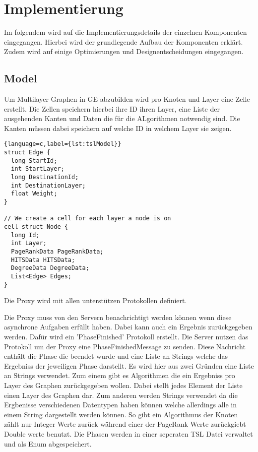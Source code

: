 \section{Implementierung}

Im folgendem wird auf die Implementierungsdetails der einzelnen Komponenten eingegangen. Hierbei wird der grundlegende Aufbau der Komponenten erklärt.
Zudem wird auf einige Optimierungen und Designentscheidungen eingegangen.


\subsection{Model}



Um Multilayer Graphen in GE abzubilden wird pro Knoten und Layer eine Zelle erstellt. Die Zellen speichern hierbei ihre ID ihren Layer, eine Liste der ausgehenden Kanten und Daten die für die ALgorithmen notwendig sind.
Die Kanten müssen dabei speichern auf welche ID in welchem Layer sie zeigen.

\begin{lstlisting}{language=c,label={lst:tslModel}}
struct Edge {
  long StartId;
  int StartLayer;
  long DestinationId;
  int DestinationLayer;
  float Weight;
}

// We create a cell for each layer a node is on
cell struct Node {
  long Id;
  int Layer;
  PageRankData PageRankData;
  HITSData HITSData;
  DegreeData DegreeData;
  List<Edge> Edges;
}
\end{lstlisting}

Die Proxy wird mit allen unterstützen Protokollen definiert. 

Die Proxy muss von den Servern benachrichtigt werden können wenn diese asynchrone Aufgaben erfüllt haben. Dabei kann auch ein Ergebnis zurückgegeben werden.
Dafür wird ein 'PhaseFinished' Protokoll erstellt. Die Server nutzen das Protokoll um der Proxy eine PhaseFinishedMessage zu senden. Diese Nachricht enthält
die Phase die beendet wurde und eine Liste an Strings welche das Ergebniss der jeweiligen Phase darstellt. Es wird hier aus zwei Gründen eine Liste an Strings verwendet. Zum einem gibt es Algorithmen die ein Ergebniss pro Layer des Graphen zurückgegeben wollen. Dabei stellt jedes Element der Liste einen Layer des Graphen dar. Zum anderen werden Strings verwendet da die Ergbenisse verschiedenen Datentypen haben können welche allerdings alle in einem String dargestellt werden können. So gibt ein Algorithmus der Knoten zählt nur Integer Werte zurück während einer der PageRank Werte zurückgiebt Double werte benutzt.
Die Phasen werden in einer seperaten TSL Datei verwaltet und als Enum abgespeichert.

